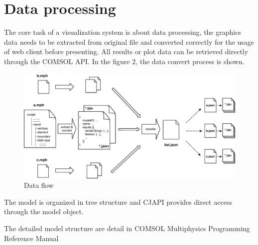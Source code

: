 \section{Data processing}

 The core task of a visualization system is about data processing, the graphics data needs to be extracted from original file and converted correctly for the usage of web client before presenting. All results or plot data can be retrieved directly through the COMSOL API\cite{COMSOL Programming reference manual}. In the figure 2, the data convert process is shown.

 \begin{figure}[htb]
  \centering
  \includegraphics[width=.9\textwidth]{Assets/Data_convert}
  \caption{Data flow}
\end{figure}

The model is organized in tree structure and CJAPI provides direct access through the model object.

The detailed model structure are detail in COMSOL Multiphysics Programming Reference Manual\cite{} 